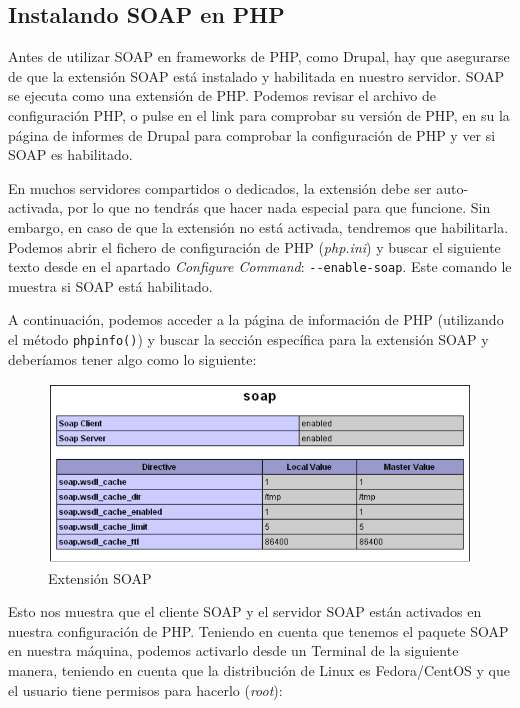 \subsection{Instalando SOAP en PHP}

Antes de utilizar SOAP en frameworks de PHP, como Drupal, hay que asegurarse de que la extensión SOAP 
está instalado y habilitada en nuestro servidor. SOAP se ejecuta como una extensión de PHP. Podemos revisar 
el archivo de configuración PHP, o pulse en el link para comprobar su versión de PHP, en su la página de 
informes de Drupal para comprobar la configuración de PHP y ver si SOAP es habilitado. 

En muchos servidores compartidos o dedicados, la extensión debe ser auto-activada, por lo que no tendrás que 
hacer nada especial para que funcione. Sin embargo, en caso de que la extensión no está activada, tendremos que habilitarla.
Podemos abrir el fichero de configuración de PHP (\textit{php.ini}) y buscar el siguiente texto desde en el apartado 
\textit{Configure Command}: \verb|--enable-soap|. Este comando le muestra si SOAP está habilitado. 

A continuación, podemos acceder a la página de información de PHP (utilizando el método \verb|phpinfo()|) y 
buscar la sección específica para la extensión SOAP y deberíamos tener algo como lo siguiente:

\begin{figure}[h]
  \centering
    \includegraphics[width=1\textwidth]{Assets/Soap/Imagenes/phpinfo.png}
  \caption{Extensión SOAP}
\end{figure}

Esto nos muestra que el cliente SOAP y el servidor SOAP están activados en nuestra configuración de PHP. 
Teniendo en cuenta que tenemos el paquete SOAP en nuestra máquina, podemos activarlo desde un Terminal 
de la siguiente manera, teniendo en cuenta que la distribución de Linux es Fedora/CentOS y que el usuario tiene 
permisos para hacerlo (\textit{root}):

